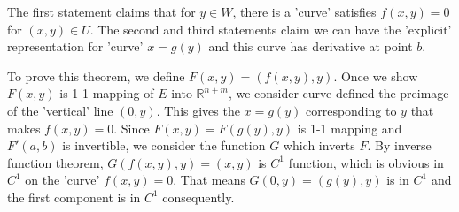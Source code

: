     The first statement claims that for $y\in W$, there is a 'curve' satisfies $f(x,y)=0$ for $(x,y)\in U$.
The second and third statements claim we can have the 'explicit' representation for 'curve' $x=g(y)$ and this curve has derivative at point $b$.\par
To prove this theorem, we define $F(x,y)=(f(x,y),y)$. Once we show $F(x,y)$ is 1-1 mapping of $E$ into $\mathbb{R}^{n+m}$, we consider curve defined the preimage of the 'vertical' line $(0,y)$. This gives the $x=g(y)$ corresponding to $y$ that makes $f(x,y)=0$. Since $F(x,y)=F(g(y),y)$ is 1-1 mapping and $F'(a,b)$ is invertible, we consider the function $G$ which inverts $F$. By inverse function theorem, $G(f(x,y),y)=(x,y)$ is $C^1$ function, which is obvious in $C^1$ on the 'curve' $f(x,y)=0$. That means $G(0,y)=(g(y),y)$ is in $C^1$ and the first component is in $C^1$ consequently.
